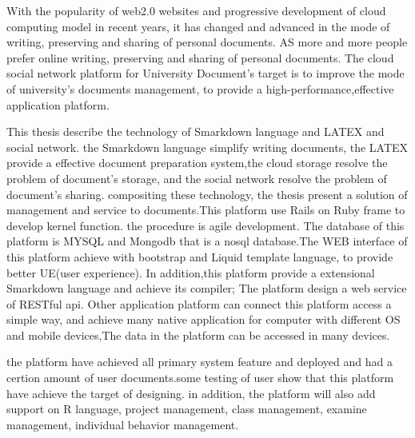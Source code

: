 \begin{eabstract}
With the popularity of web2.0 websites and progressive development of cloud computing model in recent years, it has changed and advanced in the mode of writing, preserving and sharing of personal documents. AS more and more people prefer online writing, preserving and sharing of personal documents. 
The cloud social network platform for University Document's target is to improve the mode of university's documents management, to provide a high-performance,effective application platform. 

This thesis describe the technology of Smarkdown language and LATEX and social network. the Smarkdown language simplify writing documents, the LATEX provide a effective document preparation system,the cloud storage resolve the problem of  document's storage, and the social network resolve the problem of document's sharing. compositing these technology, the thesis present a solution of management and service to documents.This platform use Rails on Ruby frame to develop kernel function. the procedure is agile development. The database of this platform is MYSQL and Mongodb that is a nosql database.The WEB interface of this platform achieve with bootstrap and Liquid template language, to provide better UE(user experience). In addition,this platform provide a extensional Smarkdown language and achieve its compiler; The platform design a web service of  RESTful api. Other application platform can connect this platform access a simple way, and achieve many native application for computer with different OS and mobile devices,The data in the platform can be accessed in many devices.

the platform have achieved all primary system  feature and deployed and had a certion amount of user documents.some testing of user show that this platform have achieve the target of designing. in addition, the platform will also add support on R language, project management, class management, examine management, individual behavior management.
\end{eabstract}

